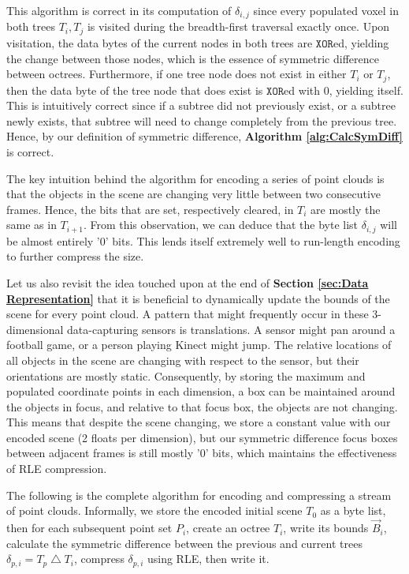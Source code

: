 \documentclass[twoside,twocolumn]{article}
\newcommand{\symdiff}{\ensuremath{\bigtriangleup}}
\begin{document}
This algorithm is correct in its computation of $\delta_{i,j}$ since every populated voxel in both trees
$T_i, T_j$ is visited during the breadth-first traversal exactly once. Upon visitation, the data bytes of
the current nodes in both trees are $\mathtt{XOR}$ed, yielding the change between those nodes, which is the
essence of symmetric difference between octrees. Furthermore, if one tree node does not exist in either
$T_i$ or $T_j$, then the data byte of the tree node that does exist is $\mathtt{XOR}$ed with 0, yielding
itself. This is intuitively correct since if a subtree did not previously exist, or a subtree newly exists,
that subtree will need to change completely from the previous tree. Hence, by our definition of
symmetric difference, \textbf{Algorithm \ref{alg:CalcSymDiff}} is correct.

The key intuition behind the algorithm for encoding a series of
point clouds is that the objects in the scene are changing very little between two consecutive frames.
Hence, the bits that are set, respectively cleared, in $T_i$ are mostly the same as in $T_{i+1}$.
From this observation, we can deduce that the byte list $\delta_{i,j}$ will be almost entirely '0' bits.
This lends itself extremely well to run-length encoding to further compress the size.

Let us also revisit the idea touched upon at the end of \textbf{Section \ref{sec:Data Representation}}
that it is beneficial to dynamically update the bounds of the scene for every point cloud. A pattern that
might frequently occur in these 3-dimensional data-capturing sensors is translations. A sensor might pan
around a football game, or a person playing Kinect might jump. The relative locations of all objects in
the scene are changing with respect to the sensor, but their orientations are mostly static. Consequently,
by storing the maximum and populated coordinate points in each dimension, a box can be maintained around
the objects in focus, and relative to that focus box, the objects are not changing. This means that despite
the scene changing, we store a constant value with our encoded scene (2 floats per dimension), but our
symmetric difference focus boxes between adjacent frames is still mostly '0' bits, which maintains the
effectiveness of RLE compression.

The following is the complete algorithm for encoding and compressing a stream of point clouds. Informally,
we store the encoded initial scene $T_0$ as a byte list, then for each subsequent point set $P_i$, create
an octree $T_i$, write its bounds $\vec{B}_i$, calculate the symmetric difference between the previous and
current trees $\delta_{p,i} = T_p \symdiff T_i$, compress $\delta_{p,i}$ using RLE, then write it.
\end{document}
